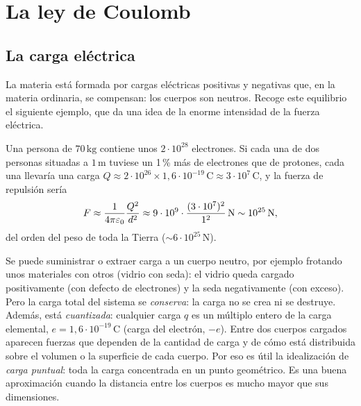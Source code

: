 \section{La ley de Coulomb}\label{sec:coulomb}
\subsection{La carga eléctrica}\label{sec:carga}
La materia está formada por cargas eléctricas positivas y negativas que, en la materia
ordinaria, se compensan: los cuerpos son neutros. Recoge este equilibrio el siguiente
ejemplo, que da una idea de la enorme intensidad de la fuerza eléctrica.

\begin{ejemplo}\label{ej:neutralidad}
Una persona de $70\,\mathrm{kg}$ contiene unos $2\cdot10^{28}$ electrones. Si cada una de
dos personas situadas a $1\,\mathrm{m}$ tuviese un 1\,\% más de electrones que de protones,
cada una llevaría una carga $Q\approx2\cdot10^{26}\times1{,}6\cdot10^{-19}\,\mathrm{C}\approx3\cdot10^{7}\,\mathrm{C}$,
y la fuerza de repulsión sería
\[
  F\approx\frac{1}{4\pi\varepsilon_{0}}\frac{Q^{2}}{d^{2}}\approx9\cdot10^{9}\cdot\frac{(3\cdot10^{7})^{2}}{1^{2}}\,\mathrm{N}\sim10^{25}\,\mathrm{N},
\]
del orden del peso de toda la Tierra ($\sim6\cdot10^{25}\,\mathrm{N}$).
\end{ejemplo}

Se puede suministrar o extraer carga a un cuerpo neutro, por ejemplo frotando unos materiales
con otros (vidrio con seda): el vidrio queda cargado positivamente (con defecto de electrones) y la
seda negativamente (con exceso). Pero la carga total del sistema se \emph{conserva}: la carga no se
crea ni se destruye. Además, está \emph{cuantizada}: cualquier carga $q$ es un múltiplo entero
de la carga elemental, $e=1{,}6\cdot10^{-19}\,\mathrm{C}$ (carga del electrón, $-e$). Entre dos cuerpos cargados aparecen
fuerzas que dependen de la cantidad de carga y de cómo está distribuida sobre el volumen o la superficie
de cada cuerpo. Por eso es útil la idealización de \emph{carga puntual}: toda la carga concentrada
en un punto geométrico. Es una buena aproximación cuando la distancia entre los cuerpos es mucho mayor que
sus dimensiones.

